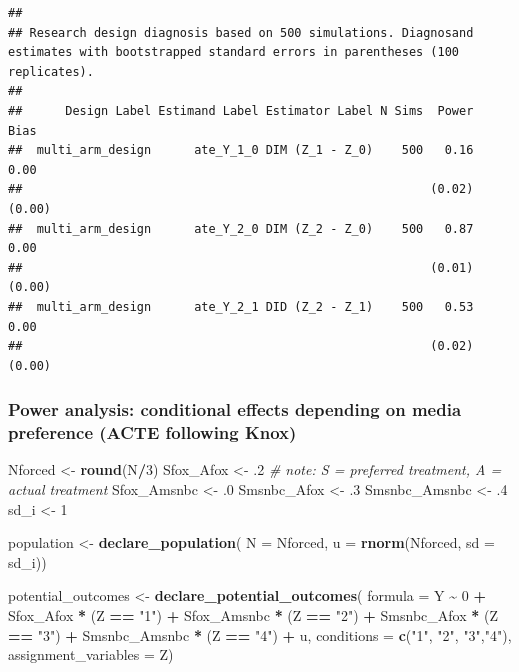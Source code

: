 \documentclass[]{article}
\newenvironment{Shaded}{\begin{snugshade}}{\end{snugshade}}
\newcommand{\CommentTok}[1]{\textcolor[rgb]{0.56,0.35,0.01}{\textit{#1}}}
\newcommand{\DataTypeTok}[1]{\textcolor[rgb]{0.13,0.29,0.53}{#1}}
\newcommand{\DecValTok}[1]{\textcolor[rgb]{0.00,0.00,0.81}{#1}}
\newcommand{\FloatTok}[1]{\textcolor[rgb]{0.00,0.00,0.81}{#1}}
\newcommand{\KeywordTok}[1]{\textcolor[rgb]{0.13,0.29,0.53}{\textbf{#1}}}
\newcommand{\NormalTok}[1]{#1}
\newcommand{\OperatorTok}[1]{\textcolor[rgb]{0.81,0.36,0.00}{\textbf{#1}}}
\newcommand{\StringTok}[1]{\textcolor[rgb]{0.31,0.60,0.02}{#1}}
\begin{document}
\begin{verbatim}
## 
## Research design diagnosis based on 500 simulations. Diagnosand estimates with bootstrapped standard errors in parentheses (100 replicates).
## 
##      Design Label Estimand Label Estimator Label N Sims  Power   Bias
##  multi_arm_design      ate_Y_1_0 DIM (Z_1 - Z_0)    500   0.16   0.00
##                                                         (0.02) (0.00)
##  multi_arm_design      ate_Y_2_0 DIM (Z_2 - Z_0)    500   0.87   0.00
##                                                         (0.01) (0.00)
##  multi_arm_design      ate_Y_2_1 DID (Z_2 - Z_1)    500   0.53   0.00
##                                                         (0.02) (0.00)
\end{verbatim}

\hypertarget{power-analysis-conditional-effects-depending-on-media-preference-acte-following-knox}{%
\subsubsection{Power analysis: conditional effects depending on media
preference (ACTE following
Knox)}\label{power-analysis-conditional-effects-depending-on-media-preference-acte-following-knox}}

\begin{Shaded}
\begin{Highlighting}[]
\NormalTok{Nforced <{-}}\StringTok{ }\KeywordTok{round}\NormalTok{(N}\OperatorTok{/}\DecValTok{3}\NormalTok{)}
\NormalTok{Sfox\_Afox <{-}}\StringTok{ }\FloatTok{.2} \CommentTok{\# note: S = preferred treatment, A = actual treatment}
\NormalTok{Sfox\_Amsnbc <{-}}\StringTok{ }\FloatTok{.0}
\NormalTok{Smsnbc\_Afox <{-}}\StringTok{ }\FloatTok{.3}
\NormalTok{Smsnbc\_Amsnbc <{-}}\StringTok{ }\FloatTok{.4}
\NormalTok{sd\_i <{-}}\StringTok{ }\DecValTok{1}

\NormalTok{population <{-}}\StringTok{ }\KeywordTok{declare\_population}\NormalTok{(}
  \DataTypeTok{N =}\NormalTok{ Nforced, }\DataTypeTok{u =} \KeywordTok{rnorm}\NormalTok{(Nforced, }\DataTypeTok{sd =}\NormalTok{ sd\_i))}

\NormalTok{potential\_outcomes <{-}}\StringTok{ }\KeywordTok{declare\_potential\_outcomes}\NormalTok{(}
  \DataTypeTok{formula =}\NormalTok{ Y }\OperatorTok{\textasciitilde{}}\StringTok{ }\DecValTok{0} \OperatorTok{+}
\StringTok{    }\NormalTok{Sfox\_Afox }\OperatorTok{*}\StringTok{ }\NormalTok{(Z }\OperatorTok{==}\StringTok{ "1"}\NormalTok{) }\OperatorTok{+}
\StringTok{    }\NormalTok{Sfox\_Amsnbc }\OperatorTok{*}\StringTok{ }\NormalTok{(Z }\OperatorTok{==}\StringTok{ "2"}\NormalTok{) }\OperatorTok{+}
\StringTok{    }\NormalTok{Smsnbc\_Afox }\OperatorTok{*}\StringTok{ }\NormalTok{(Z }\OperatorTok{==}\StringTok{ "3"}\NormalTok{) }\OperatorTok{+}
\StringTok{    }\NormalTok{Smsnbc\_Amsnbc }\OperatorTok{*}\StringTok{ }\NormalTok{(Z }\OperatorTok{==}\StringTok{ "4"}\NormalTok{) }\OperatorTok{+}\StringTok{ }\NormalTok{u,}
  \DataTypeTok{conditions =} \KeywordTok{c}\NormalTok{(}\StringTok{"1"}\NormalTok{, }\StringTok{"2"}\NormalTok{, }\StringTok{"3"}\NormalTok{,}\StringTok{"4"}\NormalTok{),}
  \DataTypeTok{assignment\_variables =}\NormalTok{ Z)}
\end{Highlighting}
\end{Shaded}
\end{document}
